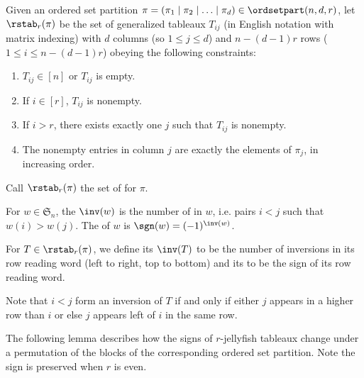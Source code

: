 \begin{definition}
\label{def:rstab}
Given an ordered set partition $\pi=(\pi_1\mid \pi_2\mid \ldots\mid \pi_d)\in\ordsetpart(n,d,r)$, let $\rstab_r(\pi)$ be the set of generalized tableaux $T_{ij}$ (in English notation with matrix indexing) with $d$ columns (so $1\leq j\leq d$) and $n-(d-1)r$ rows ($1\leq i\leq n-(d-1)r$) obeying the following constraints:
\begin{enumerate}
\item $T_{ij}\in[n]$ or $T_{ij}$ is empty.
\item If $i\in[r]$, $T_{ij}$ is nonempty.
\item If $i>r$, there exists exactly one $j$ such that $T_{ij}$ is nonempty.
\item The nonempty entries in column $j$ are exactly the elements of $\pi_j$, in increasing order.
\end{enumerate}
Call $\rstab_r(\pi)$ the set of  for $\pi$.
\end{definition}

\begin{definition}
\label{def:inv}
For $w \in \mathfrak{S}_n$, the  $\inv(w)$ is the number of  in $w$, i.e. pairs $i<j$ such that $w(i) > w(j)$. The  of $w$ is $\sgn(w)=(-1)^{\inv(w)}$.

For $T\in \rstab_r(\pi)$, we define its  $\inv(T)$ to be the number of inversions in its row reading word (left to right, top to bottom) and its  to be the sign of its row reading word.
\end{definition}

Note that $i < j$ form an inversion of $T$ if and only if either $j$ appears in a higher row than $i$ or else $j$ appears left of $i$ in the same row.

The following lemma describes how the signs of $r$-jellyfish tableaux change under a permutation of the blocks of the corresponding ordered set partition. Note the sign is preserved when $r$ is even.


